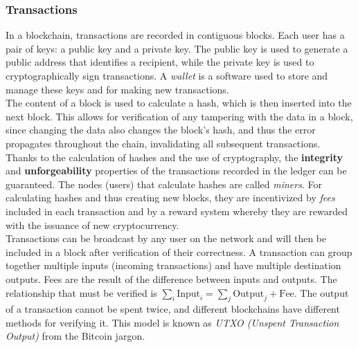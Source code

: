 \documentclass[conference]{IEEEtran}
\begin{document}
\subsubsection{Transactions}
In a blockchain, transactions are recorded in contiguous blocks. Each user has a pair of keys: a public key and a private key. The public key is used to generate a public address that identifies a recipient, while the private key is used to cryptographically sign transactions. A \textit{wallet} is a software used to store and manage these keys and for making new transactions.\\
The content of a block is used to calculate a hash, which is then inserted into the next block. This allows for verification of any tampering with the data in a block, since changing the data also changes the block's hash, and thus the error propagates throughout the chain, invalidating all subsequent transactions. Thanks to the calculation of hashes and the use of cryptography, the \textbf{integrity} and \textbf{unforgeability} properties of the transactions recorded in the ledger can be guaranteed. The nodes (users) that calculate hashes are called \textit{miners}. For calculating hashes and thus creating new blocks, they are incentivized by \textit{fees} included in each transaction and by a reward system whereby they are rewarded with the issuance of new cryptocurrency.\\
Transactions can be broadcast by any user on the network and will then be included in a block after verification of their correctness. A transaction can group together multiple inputs (incoming transactions) and have multiple destination outputs. Fees are the result of the difference between inputs and outputs. The relationship that must be verified is $\sum_i \text{Input}_i = \sum_j \text{Output}_j + \text{Fee}$. The output of a transaction cannot be spent twice, and different blockchains have different methods for verifying it. This model is known as \textit{UTXO (Unspent Transaction Output)} from the Bitcoin jargon.
\end{document}
